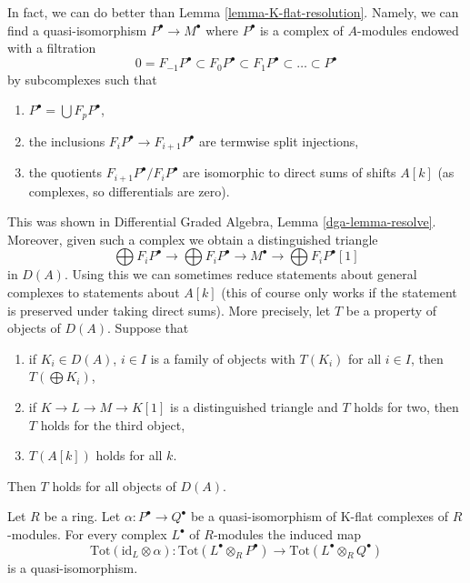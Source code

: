 \begin{remark}
\label{remark-P-resolution}
In fact, we can do better than Lemma \ref{lemma-K-flat-resolution}.
Namely, we can find a quasi-isomorphism
$P^\bullet \to M^\bullet$ where $P^\bullet$ is a complex of $A$-modules
endowed with a filtration
$$
0 = F_{-1}P^\bullet \subset F_0P^\bullet \subset
F_1P^\bullet \subset \ldots \subset P^\bullet
$$
by subcomplexes such that
\begin{enumerate}
\item $P^\bullet = \bigcup F_pP^\bullet$,
\item the inclusions $F_iP^\bullet \to F_{i + 1}P^\bullet$
are termwise split injections,
\item the quotients $F_{i + 1}P^\bullet/F_iP^\bullet$ are isomorphic to direct
sums of shifts $A[k]$ (as complexes, so differentials are zero).
\end{enumerate}
This was shown in Differential Graded Algebra, Lemma \ref{dga-lemma-resolve}.
Moreover, given such a complex we obtain a distinguished triangle
$$
\bigoplus F_iP^\bullet \to \bigoplus F_iP^\bullet \to M^\bullet
\to \bigoplus F_iP^\bullet[1]
$$
in $D(A)$. Using this we can sometimes reduce statements about general
complexes to statements about $A[k]$ (this of course only works if the
statement is preserved under taking direct sums). More precisely, let
$T$ be a property of objects of $D(A)$. Suppose that
\begin{enumerate}
\item if $K_i \in D(A)$, $i \in I$ is a family of objects with
$T(K_i)$ for all $i \in I$, then $T(\bigoplus K_i)$,
\item if $K \to L \to M \to K[1]$ is a distinguished triangle and
$T$ holds for two, then $T$ holds for the third object,
\item $T(A[k])$ holds for all $k$.
\end{enumerate}
Then $T$ holds for all objects of $D(A)$.
\end{remark}

\begin{lemma}
\label{lemma-derived-tor-quasi-isomorphism-other-side}
Let $R$ be a ring. Let
$\alpha : P^\bullet \to Q^\bullet$ be a quasi-isomorphism of
K-flat complexes of $R$-modules. For every complex $L^\bullet$
of $R$-modules the induced map
$$
\text{Tot}(\text{id}_L \otimes \alpha) :
\text{Tot}(L^\bullet \otimes_R P^\bullet)
\longrightarrow
\text{Tot}(L^\bullet \otimes_R Q^\bullet)
$$
is a quasi-isomorphism.
\end{lemma}

